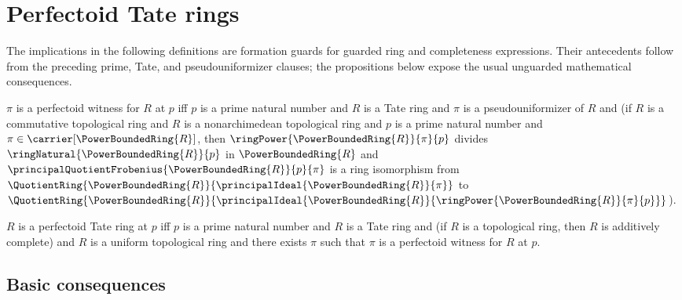 


\section{Perfectoid Tate rings}

The implications in the following definitions are formation guards for
guarded ring and completeness expressions.  Their antecedents follow from
the preceding prime, Tate, and pseudouniformizer clauses; the propositions
below expose the usual unguarded mathematical consequences.

\begin{definition}\label{perfectoid_witness}
    $\pi$ is a perfectoid witness for $R$ at $p$ iff
        $p$ is a prime natural number and
        $R$ is a Tate ring and
        $\pi$ is a pseudouniformizer of $R$ and
        (if $R$ is a commutative topological ring and
            $R$ is a nonarchimedean topological ring and
            $p$ is a prime natural number and
            $\pi\in\carrier[\PowerBoundedRing{R}]$, then
            $\ringPower{\PowerBoundedRing{R}}{\pi}{p}$ divides
                $\ringNatural{\PowerBoundedRing{R}}{p}$ in
                $\PowerBoundedRing{R}$ and
            $\principalQuotientFrobenius{\PowerBoundedRing{R}}{p}{\pi}$
                is a ring isomorphism from
                $\QuotientRing{\PowerBoundedRing{R}}{
                    \principalIdeal{\PowerBoundedRing{R}}{\pi}}$ to
                $\QuotientRing{\PowerBoundedRing{R}}{
                    \principalIdeal{\PowerBoundedRing{R}}{
                        \ringPower{\PowerBoundedRing{R}}{\pi}{p}}}$).
\end{definition}

\begin{definition}\label{perfectoid_tate_ring}
    $R$ is a perfectoid Tate ring at $p$ iff
        $p$ is a prime natural number and
        $R$ is a Tate ring and
        (if $R$ is a topological ring, then
            $R$ is additively complete) and
        $R$ is a uniform topological ring and
        there exists $\pi$ such that
            $\pi$ is a perfectoid witness for $R$ at $p$.
\end{definition}

\subsection{Basic consequences}

